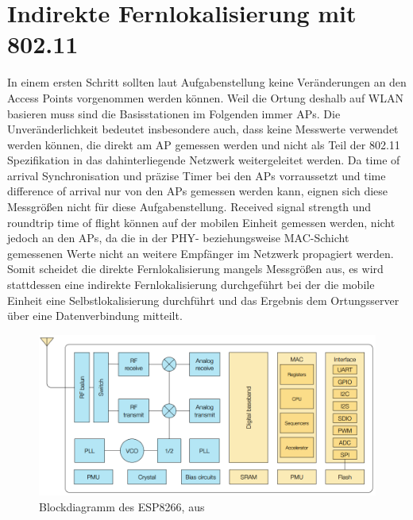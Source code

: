 \chapter{Indirekte Fernlokalisierung mit 802.11}
\label{ch:phase1}
In einem ersten Schritt sollten laut Aufgabenstellung keine Veränderungen an den Access Points vorgenommen werden können.
Weil die Ortung deshalb auf WLAN basieren muss sind die Basisstationen im Folgenden immer APs. 
Die Unveränderlichkeit bedeutet insbesondere auch, dass keine Messwerte verwendet werden können, die direkt am AP gemessen werden und nicht als Teil der 802.11 Spezifikation in das dahinterliegende Netzwerk weitergeleitet werden.
Da time of arrival Synchronisation und präzise Timer bei den APs vorraussetzt und time difference of arrival nur von den APs gemessen werden kann, eignen sich diese Messgrößen nicht für diese Aufgabenstellung.
Received signal strength und roundtrip time of flight können auf der mobilen Einheit gemessen werden, nicht jedoch an den APs, da die in der PHY- beziehungsweise MAC-Schicht gemessenen Werte nicht an weitere Empfänger im Netzwerk propagiert werden. 
Somit scheidet die direkte Fernlokalisierung mangels Messgrößen aus, es wird stattdessen eine indirekte Fernlokalisierung durchgeführt bei der die mobile Einheit eine Selbstlokalisierung durchführt und das Ergebnis dem Ortungsserver über eine Datenverbindung mitteilt.

\begin{figure}[h]
  \centering
	\includegraphics[width=\textwidth]{images/espblock.png}
  \caption{Blockdiagramm des ESP8266, aus \cite{espressif2017esp8266}}
  \label{fig:espblock}
\end{figure}

